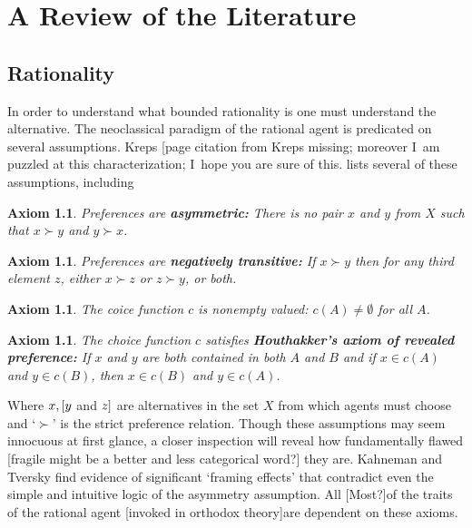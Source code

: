 \documentclass{ucthesis}
\newtheorem{axiom}[theorem]{Axiom}
\begin{document}
\chapter{A Review of the Literature}

\section{Rationality}

In order to understand what bounded rationality is one must understand the
alternative. The neoclassical paradigm {\LARGE of the rational agent }is
predicated on several assumptions. Kreps \cite[1990]{Kreps 1990} {\LARGE %
[page citation from Kreps missing; moreover I\ am puzzled at this
characterization; I\ hope you are sure of this. }lists several of these
assumptions, including

\begin{axiom}
Preferences are \textbf{asymmetric:} There is no pair $x$ and $y$ from $X$
such that $x\succ y$ and $y\succ x$.
\end{axiom}

\begin{axiom}
Preferences are \textbf{negatively transitive:} If $x\succ y$ then for any
third element $z$, either $x\succ z$ or $z\succ y$, or both.
\end{axiom}

\begin{axiom}
The coice function $c$ is nonempty valued: $c\left( A\right) \neq \emptyset $
for all $A$.
\end{axiom}

\begin{axiom}
The choice function $c$ satisfies \textbf{Houthakker's axiom of revealed
preference:} If $x$ and $y$ are both contained in both $A$ and $B$ and if $%
x\in c\left( A\right) $ and $y\in c\left( B\right) $, then $x\in c\left(
B\right) $ and $y\in c\left( A\right) $.
\end{axiom}

Where $x,{\LARGE [y}$ and ${\LARGE z]}$ are alternatives in the set $X$ from
which agents must choose and `$\succ $' is the strict preference relation.
Though these assumptions may seem innocuous at first glance, a closer
inspection will reveal how fundamentally flawed {\LARGE [fragile might be a
better and less categorical word?]} they are. Kahneman and Tversky \cite[1979%
]{prospect} find evidence of significant `framing effects' that contradict
even the simple and intuitive logic of the asymmetry assumption. All {\LARGE %
[Most?]}of the traits of the rational agent {\LARGE [invoked in orthodox
theory]}are dependent on these axioms.
\end{document}
